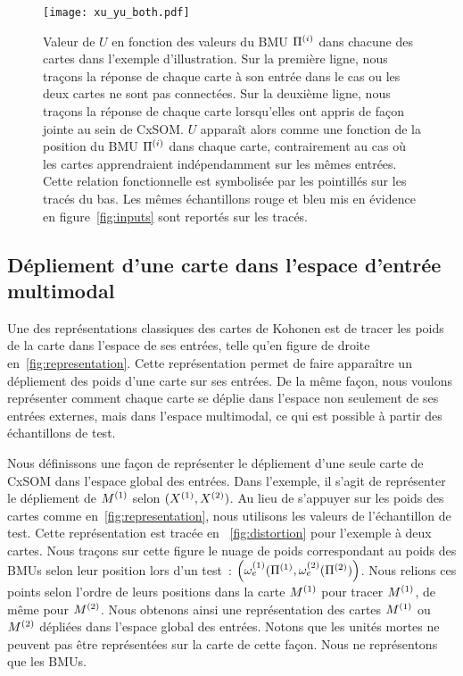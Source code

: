 \documentclass[../main]{subfiles}
\begin{document}
\begin{figure}
\centering
\texttt{[image: xu\_yu\_both.pdf]}
\caption{Valeur de $U$ en fonction des valeurs du BMU $\Pi^{({i})}$ dans chacune des cartes dans l'exemple d'illustration. Sur la première ligne, nous traçons la réponse de chaque carte à son entrée dans le cas ou les deux cartes ne sont pas connectées. Sur la deuxième ligne, nous traçons la réponse de chaque carte lorsqu'elles ont appris de façon jointe au sein de CxSOM.
$U$ apparaît alors comme une fonction de la position du BMU $\Pi^{({i})}$ dans chaque carte, contrairement au cas où les cartes apprendraient indépendamment sur les mêmes entrées. Cette relation fonctionnelle est symbolisée par les pointillés sur les tracés du bas. Les mêmes échantillons rouge et bleu mis en évidence en figure~\ref{fig:inputs} sont reportés sur les tracés.}
\label{fig:piu}
\end{figure}

\subsection{Dépliement d'une carte dans l'espace d'entrée multimodal}

Une des représentations classiques des cartes de Kohonen est de tracer les poids de la carte dans l'espace de ses entrées, telle qu'en figure de droite en~\ref{fig:representation}. Cette représentation permet de faire apparaître un dépliement des poids d'une carte sur ses entrées.
De la même façon, nous voulons représenter comment chaque carte se déplie dans l'espace non seulement de ses entrées externes, mais dans l'espace multimodal, ce qui est possible à partir des échantillons de test.

Nous définissons une façon de représenter le dépliement d'une seule carte de CxSOM dans l'espace global des entrées. Dans l'exemple, il s'agit de représenter le dépliement de $M^{({1})}$ selon $(X^{({1})},X^{({2})})$.
Au lieu de s'appuyer sur les poids des cartes comme en~\ref{fig:representation}, nous utilisons les valeurs de l'échantillon de test. Cette représentation est tracée en ~\ref{fig:distortion} pour l'exemple à deux cartes.
Nous traçons sur cette figure le nuage de poids correspondant au poids des BMUs selon leur position lors d'un test~: $\left( \omega_e^{({1})}(\Pi^{({1})},\omega_e^{({2})}(\Pi^{({2})}) \right)$. Nous relions ces points selon l'ordre de leurs positions dans la carte $M^{({1})}$ pour tracer $M^{({1})}$, de même pour $M^{({2})}$. Nous obtenons ainsi une représentation des cartes $M^{({1})}$ ou $M^{({2})}$ dépliées dans l'espace global des entrées. 
Notons que les unités mortes ne peuvent pas être représentées sur la carte de cette façon. Nous ne représentons que les BMUs. 
\end{document}
